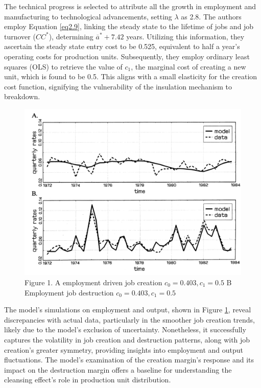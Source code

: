 \documentclass[12pt]{report}
\begin{document}
The technical progress is selected to attribute all the growth in employment and manufacturing to technological
advancements, setting \(\lambda\) as 2.8. The authors employ Equation \ref{eq2.9}, linking the steady state to the
lifetime of jobs and job turnover (\(CC^*\)), determining \(\overline{a}^*+7.42\) years. Utilizing this information,
they ascertain the steady state entry cost to be 0.525, equivalent to half a year's operating costs for production
units. Subsequently, they employ ordinary least squares (OLS) to retrieve the value of \(c_1\), the marginal cost of
creating a new unit, which is found to be 0.5. This aligns with a small elasticity for the creation cost function,
signifying the vulnerability of the insulation mechanism to breakdown. 
\begin{figure}
    \centering
    \includegraphics[scale = 0.6]{figure/Plot2.5.png}
    \caption{Figure 1. A employment driven job creation \(c_0=0.403, c_1=0.5\) B Employment job destruction \(c_0=0.403, c_1=0.5\)} 
    \label{plot:2.5}
\end{figure}
The model's simulations on employment and output, shown in Figure \ref{plot:2.5}, reveal discrepancies with actual data,
particularly in the smoother job creation trends, likely due to the model's exclusion of uncertainty. Nonetheless, it
successfully captures the volatility in job creation and destruction patterns, along with job creation's greater
symmetry, providing insights into employment and output fluctuations. The model's examination of the creation margin's
response and its impact on the destruction margin offers a baseline for understanding the cleansing effect's role in
production unit distribution.
\end{document}
